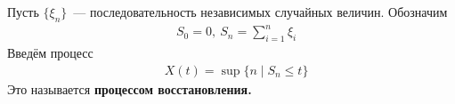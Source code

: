 \begin{Def}
    Пусть $\{\xi_n\}$~--- последовательность независимых случайных величин.
    Обозначим
    \begin{align*}
      & S_0 = 0, \ S_n = \sum_{i=1}^n \xi_i
    \end{align*}
    Введём процесс
    \begin{align*}
      & X(t) = \sup \{n \mid S_n \leq t\}
    \end{align*}
    Это называется \textbf{процессом восстановления.}
\end{Def}
